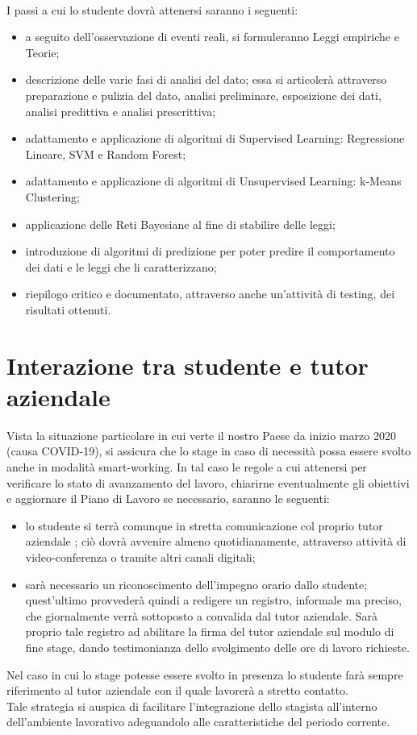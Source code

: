 \\I passi a cui lo studente dovrà attenersi saranno i seguenti:
\begin{itemize}
\item a seguito dell'osservazione di eventi reali, si formuleranno Leggi empiriche e Teorie;
\item descrizione delle varie fasi di analisi del dato; essa si articolerà attraverso preparazione e pulizia del dato, analisi preliminare, esposizione dei dati, analisi predittiva e analisi prescrittiva;  
\item adattamento e applicazione di algoritmi di Supervised Learning: Regressione Lineare, SVM e Random Forest;
\item adattamento e applicazione di algoritmi di Unsupervised Learning: k-Means Clustering;
\item applicazione delle Reti Bayesiane al fine di stabilire delle leggi;
\item introduzione di algoritmi di predizione per poter predire il comportamento dei dati e le leggi che li caratterizzano;
\item riepilogo critico e documentato, attraverso anche un'attività di testing, dei risultati ottenuti.
\end{itemize}

\section{Interazione tra studente e tutor aziendale}
Vista la situazione particolare in cui verte il nostro Paese da inizio marzo 2020 (causa COVID-19), si assicura che lo stage in caso di necessità possa essere svolto anche in modalità smart-working. In tal caso le regole a cui attenersi per verificare lo stato di avanzamento del lavoro, chiarirne eventualmente gli obiettivi e aggiornare il Piano di Lavoro se necessario, saranno le seguenti:
\begin{itemize}
\item lo studente si terrà comunque in stretta comunicazione col proprio tutor aziendale \Greg; ciò dovrà avvenire almeno quotidianamente, attraverso attività di video‐conferenza o tramite altri canali digitali;
\item sarà necessario un riconoscimento dell'impegno orario dallo studente; quest'ultimo provvederà quindi a redigere un registro, informale ma preciso, che giornalmente verrà sottoposto a convalida dal tutor aziendale. Sarà proprio tale registro ad abilitare la firma del tutor aziendale sul modulo di fine stage, dando testimonianza dello svolgimento delle ore di lavoro richieste.
\end{itemize}  
Nel caso in cui lo stage potesse essere svolto in presenza lo studente farà sempre riferimento al tutor aziendale \Greg{} con il quale lavorerà a stretto contatto. \\Tale strategia si auspica di facilitare l'integrazione dello stagista all'interno dell'ambiente lavorativo adeguandolo alle caratteristiche del periodo corrente.

